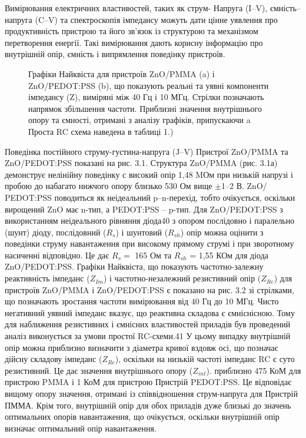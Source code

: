 \documentclass[a4paper,14pt]{extreport}
\begin{document}
Вимірювання електричних властивостей, таких як струм-
Напруга (I–V), ємність–напруга (C–V) та спектроскопія імпедансу можуть дати цінне уявлення про продуктивність пристрою та його зв’язок із структурою та механізмом
перетворення енергії. Такі вимірювання дають корисну інформацію
про внутрішній опір, ємність і випрямлення
поведінку пристроїв.\\ 
\begin{figure}[h!]
\caption{\small{Графіки Найквіста для пристроїв ZnO/PMMA (a) і ZnO/PEDOT:PSS (b), що показують реальні та уявні компоненти імпедансу (Z), виміряні між 40 Гц і
10 МГц. Стрілки позначають напрямок збільшення частоти. Приблизні значення внутрішнього опору та ємності, отримані з аналізу графіків, припускаючи a
Проста RC схема наведена в таблиці 1.)}}
\end{figure}
Поведінка постійного струму-густина-напруга (J–V)
Пристрої ZnO/PMMA та ZnO/PEDOT:PSS показані на рис. 3.1.
Структура ZnO/PMMA (рис. 3.1а) демонструє нелінійну поведінку с
високий опір 1,48 MОм при низькій напрузі і пробою до
набагато нижчого опору близько 530 Ом вище $\pm $1–2 В. ZnO/
PEDOT:PSS поводиться як неідеальний p–n-перехід, тобто
очікується, оскільки вирощений ZnO має n-тип, а PEDOT:PSS – p-тип.  Для ZnO/PEDOT:PSS з використанням неідеального рівняння діода40 з опором послідовно і паралельно (шунт)
діоду, послідовний ($R_{s}$) і шунтовий ($R_{sh}$) опір можна оцінити з поведінки струму навантаження при високому прямому струмі і при зворотному насиченні відповідно. Це дає $R_{s}=$
165 Ом та $R_{sh}$ = 1,55 КОм для діода ZnO/PEDOT:PSS.
Графіки Найквіста, що показують частотно-залежну реактивність
імпеданс ($Z_{Im}$) і частотно-незалежний резистивний опір ($Z_{Re}$) для пристроїв ZnO/PMMA і ZnO/PEDOT:PSS є
показано на рис. 3.2 зі стрілками, що позначають зростання частоти
вимірювання від 40 Гц до 10 МГц. Чисто негативний
уявний імпеданс вказує, що реактивна складова є
ємніснісною. Тому для наближення резистивних і ємнісних властивостей приладів був проведений аналіз
виконується за умови простої RC-схеми.41 У цьому випадку
внутрішній опір можна приблизно визначити з діаметра
кривої вздовж осі, що позначає дійсну складову
імпеданс ($Z_{Re}$), оскільки на низькій частоті імпеданс RC є
суто резистивний. Це дає значення внутрішнього опору ($Z_{int}$).
приблизно 475 КоМ для пристрою PMMA і 1 КоМ для пристрою
Пристрій PEDOT:PSS. Це відповідає вищому опору
значення, отримані із співвідношення струм-напруга для
Пристрій ПММА. Крім того, внутрішній опір для обох
приладів дуже близькі до значень оптимальних опорів навантаження, що очікується, оскільки внутрішній опір
визначає оптимальний опір навантаження.\\ 
\end{document}
